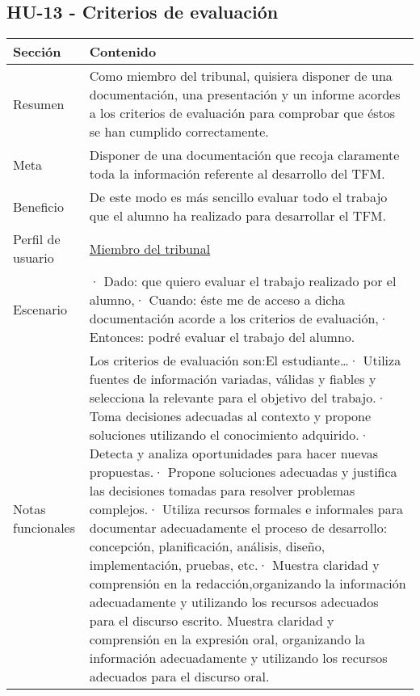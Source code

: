 \subsection{HU-13 - Criterios de evaluación}
\label{sec:hu13}

\begin{table}[H]
    \centering
    \def\arraystretch{1.25}
    \begin{adjustbox}{max width=\textwidth}
    \begin{tabularx}{\textwidth}{|l|L|}
    \hline
        \textbf{Sección} & \textbf{Contenido} \\ \hline
    \hline
        Resumen & Como miembro del tribunal, quisiera disponer de una documentación, una presentación y un informe acordes a los criterios de evaluación para comprobar que éstos se han cumplido correctamente. \\ \hline
        Meta & Disponer de una documentación que recoja claramente toda la información referente al desarrollo del TFM. \\ \hline
        Beneficio & De este modo es más sencillo evaluar todo el trabajo que el alumno ha realizado para desarrollar el TFM. \\ \hline
        Perfil de usuario & \hyperref[sec:personaMiembroTribunal]{Miembro del tribunal} \\ \hline
        Escenario & · Dado: que quiero evaluar el trabajo realizado por el alumno,\linebreak · Cuando: éste me de acceso a dicha documentación acorde a los criterios de evaluación,\linebreak · Entonces: podré evaluar el trabajo del alumno. \\ \hline
        Notas funcionales & Los criterios de evaluación son:\linebreak \linebreak El estudiante…\linebreak · Utiliza fuentes de información variadas, válidas y fiables y selecciona la relevante para el objetivo del trabajo.\linebreak · Toma decisiones adecuadas al contexto y propone soluciones utilizando el conocimiento adquirido.\linebreak · Detecta y analiza oportunidades para hacer nuevas propuestas.\linebreak · Propone soluciones adecuadas y justifica las decisiones tomadas para resolver problemas complejos.\linebreak · Utiliza recursos formales e informales para documentar adecuadamente el proceso de desarrollo: concepción, planificación, análisis, diseño, implementación, pruebas, etc.\linebreak · Muestra claridad y comprensión en la redacción,organizando la información adecuadamente y utilizando los recursos adecuados para el discurso escrito. Muestra claridad y comprensión en la expresión oral, organizando la información adecuadamente y utilizando los recursos adecuados para el discurso oral. \\ \hline

\end{tabularx}
\end{adjustbox}
\end{table}
